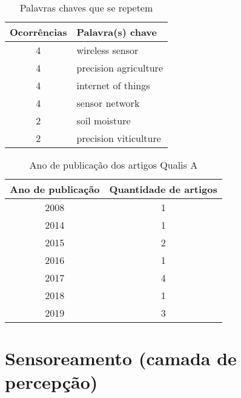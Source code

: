 \documentclass[
article,			%
12pt,				%
oneside,			%
a4paper,			%
english,			%
brazil,				%
sumario=tradicional
]{abntex2}
\begin{document}
\begin{table}[!htb]
  \centering
  \caption{Palavras chaves que se repetem}
  \begin{tabular}{|c|l|}
    \hline
    \textbf{Ocorrências} & \textbf{Palavra(s) chave} \\ \hline
    4                    & wireless sensor           \\ \hline
    4                    & precision agriculture     \\ \hline
    4                    & internet of things        \\ \hline
    4                    & sensor network            \\ \hline
    2                    & soil moisture             \\ \hline
    2                    & precision viticulture     \\ \hline
  \end{tabular}
\end{table}

\begin{table}[!htb]
  \centering
  \caption{Ano de publicação dos artigos Qualis A}
  \begin{tabular}{|c|c|}
    \hline
    \textbf{Ano de publicação} & \textbf{Quantidade de artigos} \\ \hline
    2008 & 1 \\ \hline
    2014 & 1 \\ \hline
    2015 & 2 \\ \hline
    2016 & 1 \\ \hline
    2017 & 4 \\ \hline
    2018 & 1 \\ \hline
    2019 & 3 \\ \hline
  \end{tabular}
\end{table}

%


\section{Sensoreamento (camada de percepção)}\label{Sensoreamento do solo (camada de percepção)}
\end{document}
